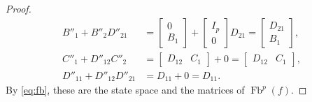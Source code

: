 \documentclass[11pt,a4paper]{article}
\theoremstyle{plain}
\theoremstyle{definition}
\theoremstyle{remark}
\DeclareMathOperator{\Fb}{Fb}
\begin{document}
\begin{proof}
\begin{align*}
        B''_1 + B''_2 D''_{21}
         & = \begin{bmatrix} 0 \\ B_1 \end{bmatrix} + \begin{bmatrix} I_p \\ 0 \end{bmatrix} D_{21}
        = \begin{bmatrix} D_{21} \\ B_1 \end{bmatrix}, \\
        C''_1 + D''_{12} C''_2
         & = \begin{bmatrix} D_{12} & C_1 \end{bmatrix} + 0
        = \begin{bmatrix} D_{12} & C_1 \end{bmatrix}, \\
        D''_{11} + D''_{12} D''_{21}
         & = D_{11} + 0 = D_{11} .
    \end{align*}
    By \cref{eq:fb}, these are the state space and the matrices of $\Fb^p(f)$.


\end{proof}
\end{document}
